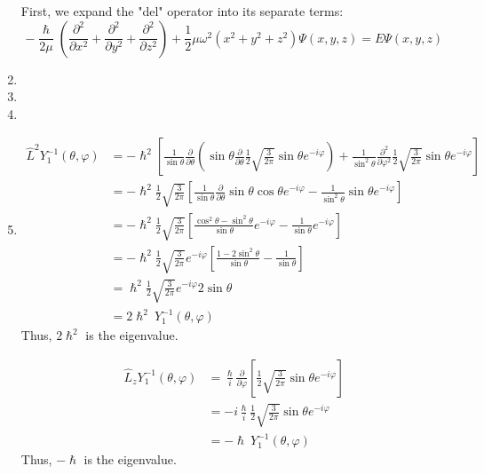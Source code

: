 \documentclass[10pt]{article}
\begin{document}
\begin{enumerate}
    First, we expand the "del" operator into its separate terms:
    \begin{equation*}
      - \frac{\hslash}{2 \mu} \left( \frac{\partial^2 }{\partial x^2}+\frac{\partial ^2}{\partial y^2} + \frac{\partial ^2}{\partial z^2} \right) + \frac{1}{2} \mu \omega ^2 \left( x^2+y^2+z^2 \right)  \Psi \left( x,y,z \right) = E \Psi \left( x,y,z \right)
    \end{equation*}
  \item 
  \item 
  \item 
  \item 
    \begin{align*}
      \hat{L}^2 Y_{1}^{-1}\left( \theta, \varphi \right) &= - \hslash^2 \left[ \frac{1}{\sin \theta} \frac{\partial }{\partial \theta} \left( \sin \theta \frac{\partial }{\partial \theta} \frac{1}{2} \sqrt{\frac{3}{2\pi}} \sin \theta e ^ {-i \varphi} \right) + \frac{1}{\sin ^2 \theta} \frac{\partial ^2}{\partial \varphi^2} \frac{1}{2}\sqrt{\frac{3}{2\pi}} \sin \theta e ^ {-i \varphi}\right] \\
      &=  - \hslash^2 \frac{1}{2} \sqrt{\frac{3}{2\pi}} \left[ \frac{1}{\sin \theta} \frac{\partial }{\partial \theta} \sin \theta \cos \theta e ^ {-i \varphi} - \frac{1}{\sin ^2 \theta} \sin \theta e ^ {-i \varphi}\right] \\
      &=  - \hslash^2 \frac{1}{2} \sqrt{\frac{3}{2\pi}} \left[ \frac{\cos^2\theta-\sin^2\theta}{\sin \theta} e ^ {-i \varphi} - \frac{1}{\sin \theta} e ^ {-i \varphi}\right] \\
      &=  - \hslash^2 \frac{1}{2} \sqrt{\frac{3}{2\pi}} e ^ {-i\varphi}\left[ \frac{1-2\sin^2\theta}{\sin \theta} - \frac{1}{\sin \theta} \right] \\
      &=  \hslash^2 \frac{1}{2} \sqrt{\frac{3}{2\pi}} e ^ {-i\varphi} 2 \sin\theta \\
      &= 2 \hslash^2 ~ Y_{1}^{-1} \left( \theta, \varphi \right)
    \end{align*}
    Thus, $ 2 \hslash ^2 $ is the eigenvalue.

    \begin{align*}
      \hat{L}_{z} Y_{1}^{-1}\left( \theta, \varphi \right) &= \frac{\hslash}{i} \frac{\partial }{\partial \varphi} \left[ \frac{1}{2} \sqrt{\frac{3}{2\pi}} \sin \theta e ^ {-i \varphi}\right] \\
      &= -i \frac{\hslash}{i} \frac{1}{2} \sqrt{\frac{3}{2\pi}} \sin \theta e ^ {-i \varphi} \\
      &= - \hslash ~ Y_{1}^{-1}\left( \theta, \varphi \right)
    \end{align*}
    Thus, $ -\hslash $ is the eigenvalue.


\end{enumerate}
\end{document}
